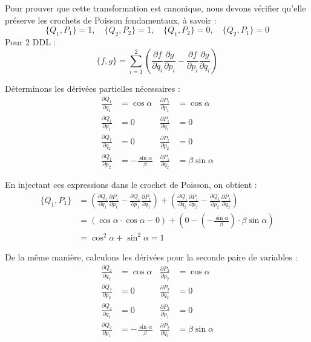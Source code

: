 \documentclass[french]{yLectureNote}
\begin{document}



Pour prouver que cette transformation est canonique, nous devons vérifier qu'elle préserve les crochets de Poisson fondamentaux, à savoir :
\begin{equation}
    \{Q_1, P_1\} = 1, \quad \{Q_2, P_2\} = 1, \quad \{Q_1, P_2\} = 0, \quad \{Q_2, P_1\} = 0
\end{equation}
Pour 2 DDL :
\begin{equation}
    \{f,g\} = \sum_{i=1}^2 \left( \frac{\partial f}{\partial q_i}\frac{\partial g}{\partial p_i} - \frac{\partial f}{\partial p_i}\frac{\partial g}{\partial q_i} \right)
\end{equation}


Déterminons les dérivées partielles nécessaires :
\begin{align*}
    \frac{\partial Q_1}{\partial q_1} &= \cos \alpha & \frac{\partial P_1}{\partial p_1} &= \cos \alpha \\
    \frac{\partial Q_1}{\partial p_1} &= 0 & \frac{\partial P_1}{\partial q_1} &= 0 \\
    \frac{\partial Q_1}{\partial q_2} &= 0 & \frac{\partial P_1}{\partial p_2} &= 0 \\
    \frac{\partial Q_1}{\partial p_2} &= -\frac{\sin \alpha}{\beta} & \frac{\partial P_1}{\partial q_2} &= \beta \sin \alpha
\end{align*}

En injectant ces expressions dans le crochet de Poisson, on obtient :
\begin{align*}
    \{Q_1, P_1\} &= \left(\frac{\partial Q_1}{\partial q_1}\frac{\partial P_1}{\partial p_1} - \frac{\partial Q_1}{\partial p_1}\frac{\partial P_1}{\partial q_1}\right) + \left(\frac{\partial Q_1}{\partial q_2}\frac{\partial P_1}{\partial p_2} - \frac{\partial Q_1}{\partial p_2}\frac{\partial P_1}{\partial q_2}\right) \\
    &= (\cos \alpha \cdot \cos \alpha - 0) + \left(0 - \left(-\frac{\sin \alpha}{\beta}\right) \cdot \beta \sin \alpha\right) \\
    &= \cos^2 \alpha + \sin^2 \alpha = 1
\end{align*}


De la même manière, calculons les dérivées pour la seconde paire de variables :
\begin{align*}
    \frac{\partial Q_2}{\partial q_2} &= \cos \alpha & \frac{\partial P_2}{\partial p_2} &= \cos \alpha \\
    \frac{\partial Q_2}{\partial p_2} &= 0 & \frac{\partial P_2}{\partial q_2} &= 0 \\
    \frac{\partial Q_2}{\partial q_1} &= 0 & \frac{\partial P_2}{\partial p_1} &= 0 \\
    \frac{\partial Q_2}{\partial p_1} &= -\frac{\sin \alpha}{\beta} & \frac{\partial P_2}{\partial q_1} &= \beta \sin \alpha
\end{align*}
\end{document}
